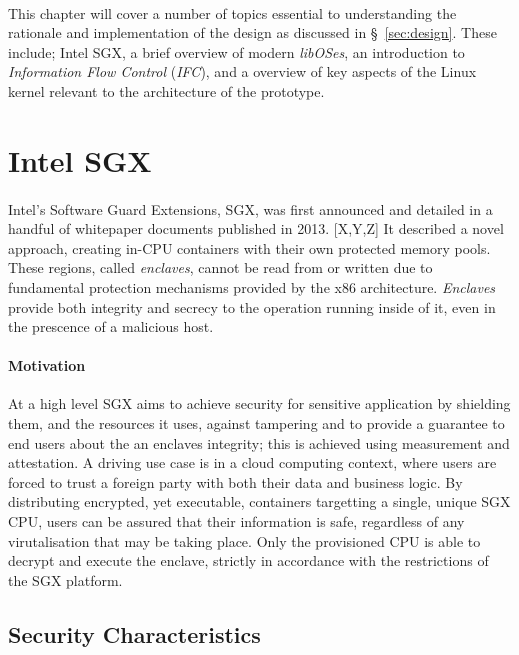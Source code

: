 
\paragraph{} This chapter will cover a number of topics essential to understanding the rationale and implementation of the design as discussed in §~\ref{sec:design}. These include; Intel SGX, a brief overview of modern \textit{libOSes}, an introduction to \textit{Information Flow Control} (\textit{IFC}), and a overview of key aspects of the Linux kernel relevant to the architecture of the prototype.

\section{Intel SGX}

\paragraph{} Intel's Software Guard Extensions, SGX, was first announced and detailed in a handful of whitepaper documents published in 2013. [X,Y,Z] It described a novel approach, creating in-CPU containers with their own protected memory pools. These regions, called \textit{enclaves}, cannot be read from or written due to fundamental protection mechanisms provided by the x86 architecture. \textit{Enclaves} provide both integrity and secrecy to the operation running inside of it, even in the prescence of a malicious host.

\paragraph{Motivation} At a high level SGX aims to achieve security for sensitive application by shielding them, and the resources it uses, against tampering and to provide a guarantee to end users about the an enclaves integrity; this is achieved using measurement and attestation. A driving use case is in a cloud computing context, where users are forced to trust a foreign party with both their data and business logic. By distributing encrypted, yet executable, containers targetting a single, unique SGX CPU, users can be assured that their information is safe, regardless of any virutalisation that may be taking place. Only the provisioned CPU is able to decrypt and execute the enclave, strictly in accordance with the restrictions of the SGX platform.

\subsection{Security Characteristics}

